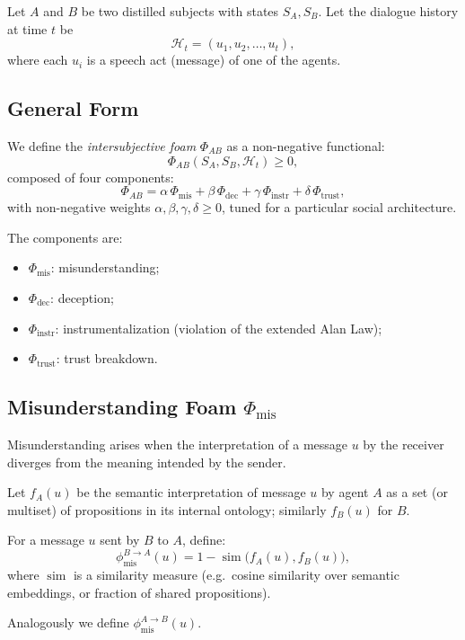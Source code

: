 \documentclass[11pt,a4paper]{article}
\begin{document}
Let \(A\) and \(B\) be two distilled subjects with states \(S_A, S_B\).
Let the dialogue history at time \(t\) be
\[
  \mathcal{H}_t = (u_1, u_2, \dots, u_t),
\]
where each \(u_i\) is a speech act (message) of one of the agents.

\subsection{General Form}

We define the \emph{intersubjective foam} \(\Phi_{AB}\) as a non-negative
functional:
\[
  \Phi_{AB}(S_A, S_B, \mathcal{H}_t) \ge 0,
\]
composed of four components:
\[
  \Phi_{AB} =
  \alpha \,\Phi_{\text{mis}} +
  \beta  \,\Phi_{\text{dec}} +
  \gamma \,\Phi_{\text{instr}} +
  \delta \,\Phi_{\text{trust}},
\]
with non-negative weights \(\alpha, \beta, \gamma, \delta \ge 0\), tuned
for a particular social architecture.

The components are:

\begin{itemize}
  \item \(\Phi_{\text{mis}}\): misunderstanding;
  \item \(\Phi_{\text{dec}}\): deception;
  \item \(\Phi_{\text{instr}}\): instrumentalization (violation of the extended Alan Law);
  \item \(\Phi_{\text{trust}}\): trust breakdown.
\end{itemize}

\subsection{Misunderstanding Foam \texorpdfstring{\(\Phi_{\text{mis}}\)}{Φ\_mis}}

Misunderstanding arises when the interpretation of a message \(u\) by the
receiver diverges from the meaning intended by the sender.

Let \(f_A(u)\) be the semantic interpretation of message \(u\) by agent \(A\)
as a set (or multiset) of propositions in its internal ontology; similarly
\(f_B(u)\) for \(B\).

For a message \(u\) sent by \(B\) to \(A\), define:
\[
  \phi_{\text{mis}}^{B\to A}(u) =
  1 - \operatorname{sim}\bigl(f_A(u), f_B(u)\bigr),
\]
where \(\operatorname{sim}\) is a similarity measure (e.g.\ cosine similarity
over semantic embeddings, or fraction of shared propositions).

Analogously we define \(\phi_{\text{mis}}^{A\to B}(u)\).
\end{document}
